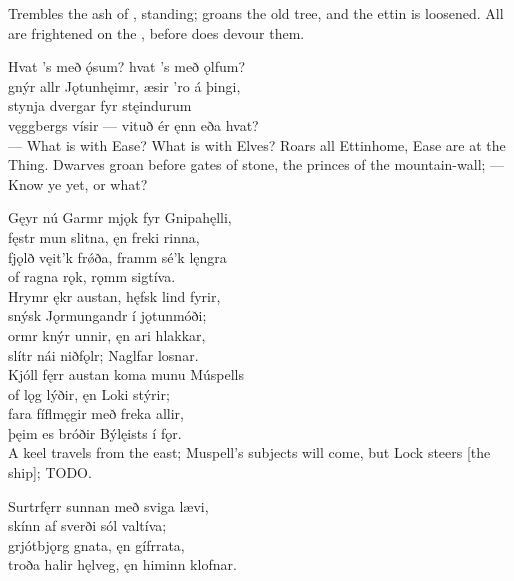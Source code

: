 \bvb Trembles the ash of , standing; groans the old tree, and the ettin is loosened. All are frightened on the , before  does devour them.

\bva Hvat ’s með ǫ́sum? \hld hvat ’s með ǫlfum? \\%
gnýr allr Jǫtunhęimr, \hld æsir ’ro á þingi, \\%
stynja dvergar \hld fyr stęindurum \\%
vęggbergs vísir — \hld vituð ér ęnn eða hvat?\\%

\bvb — What is with Ease? What is with Elves? Roars all Ettinhome, Ease are at the Thing. Dwarves groan before gates of stone, the princes of the mountain-wall; — Know ye yet, or what?

\bva Gęyr nú Garmr mjǫk \hld fyr Gnipahęlli, \\%
fęstr mun slitna, \hld ęn freki rinna, \\%
fjǫlð vęit'k frǿða, \hld framm sé'k lęngra \\%
of ragna rǫk, \hld rǫmm sigtíva.\\%

\bva Hrymr ękr austan, \hld hęfsk lind fyrir, \\%
snýsk Jǫrmungandr \hld í jǫtunmóði; \\%
ormr knýr unnir, \hld ęn ari hlakkar, \\%
slítr nái niðfǫlr; \hld Naglfar losnar.\\%

\bva Kjóll fęrr austan \hld koma munu Múspells \\%
of lǫg lýðir, \hld ęn Loki stýrir; \\%
fara fíflmęgir \hld með freka allir, \\%
þęim es bróðir \hld Býlęists í fǫr.\\%

\bvb A keel travels from the east; Muspell’s subjects will come, but Lock steers [the ship]; TODO.

\bva Surtr\footnotemark[1] fęrr sunnan \hld með sviga lævi, \\%
skínn af sverði \hld sól valtíva; \\%
grjótbjǫrg gnata, \hld ęn gífr\footnotemark[2] rata, \\%
troða halir hęlveg, \hld ęn himinn klofnar.\\%

